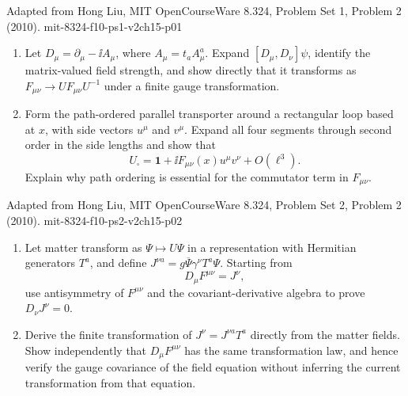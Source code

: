 
\begin{enumerate}
  {Adapted from Hong Liu, MIT OpenCourseWare 8.324, Problem Set 1, Problem 2 (2010).}
  {mit-8324-f10-ps1-v2ch15-p01}
  \begin{enumerate}
    \item[(a)]
    Let \(D_\mu=\partial_\mu-\ii A_\mu\), where
    \(A_\mu=t_a A^a_\mu\).  Expand
    \([D_\mu,D_\nu]\psi\), identify the matrix-valued field strength, and show
    directly that it transforms as
    \(F_{\mu\nu}\longrightarrow UF_{\mu\nu}U^{-1}\) under a finite gauge
    transformation.
    \item[(b)]
    Form the path-ordered parallel transporter around a rectangular loop based
    at \(x\), with side vectors \(u^\mu\) and \(v^\mu\).  Expand all four
    segments through second order in the side lengths and show that
    \[
      U_\square=\mathbf{1}+\ii F_{\mu\nu}(x)u^\mu v^\nu+O(\ell^3).
    \]
    Explain why path ordering is essential for the commutator term in
    \(F_{\mu\nu}\).
  \end{enumerate}

  {Adapted from Hong Liu, MIT OpenCourseWare 8.324, Problem Set 2, Problem 2 (2010).}
  {mit-8324-f10-ps2-v2ch15-p02}
  \begin{enumerate}
    \item[(a)]
    Let matter transform as \(\Psi\mapsto U\Psi\) in a representation with
    Hermitian generators \(T^a\), and define
    \(J^{\nu a}=g\overline\Psi\gamma^\nu T^a\Psi\).  Starting from
    \[
      D_\mu F^{\mu\nu}=J^\nu,
    \]
    use antisymmetry of \(F^{\mu\nu}\) and the covariant-derivative algebra
    to prove \(D_\nu J^\nu=0\).
    \item[(b)]
    Derive the finite transformation of \(J^\nu=J^{\nu a}T^a\) directly
    from the matter fields.  Show independently that
    \(D_\mu F^{\mu\nu}\) has the same transformation law, and hence verify
    the gauge covariance of the field equation without inferring the
    current transformation from that equation.
  \end{enumerate}


\end{enumerate}
